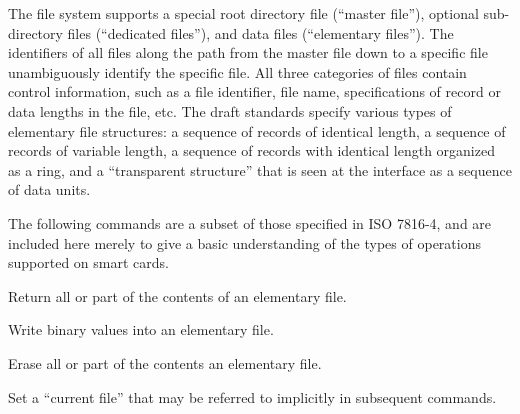 \begin{htmllist}

    
    The file system supports a special root directory file (``master
    file''), optional sub-directory files (``dedicated files''), and data
    files (``elementary files''). The identifiers of all files along the
    path from the master file down to a specific file unambiguously
    identify the specific file. All three categories of files contain
    control information, such as a file identifier, file name,
    specifications of record or data lengths in the file, etc. The draft
    standards specify various types of elementary file structures: a
    sequence of records of identical length, a sequence of records of
    variable length, a sequence of records with identical length organized
    as a ring, and a ``transparent structure'' that is seen at the
    interface as a sequence of data units.


    
    The following commands are a subset of those specified in ISO 7816-4,
    and are included here merely to give a basic understanding of the types
    of operations supported on smart cards.

      
     Return all or part
        of the contents of an elementary file.
      
     Write binary
    values into an elementary file.
    
     Erase all or part of
      the contents an elementary file.
      
     Set a ``current file''
      that may be referred to implicitly in subsequent commands.
      

\end{htmllist}
